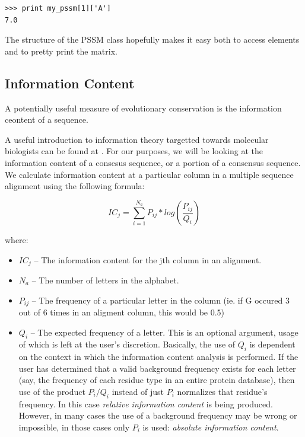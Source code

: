 \documentclass{report}
\begin{document}
\begin{verbatim}
>>> print my_pssm[1]['A']
7.0
\end{verbatim}

The structure of the PSSM class hopefully makes it easy both to access elements and to pretty print the matrix.

\subsection{Information Content}
\label{sec:getting_info_content}

A potentially useful measure of evolutionary conservation is the information ceontent of a sequence.


A useful introduction to information theory targetted towards molecular biologists can be found at . For our purposes, we will be looking at the information content of a consesus sequence, or a portion of a consensus sequence. We calculate information content at a particular column in a multiple sequence alignment using the following formula:

\begin{displaymath}
IC_{j} = \sum_{i=1}^{N_{a}} P_{ij} * log(\frac{P_{ij}}{Q_{i}}) 
\end{displaymath}

where:

\begin{itemize}
  \item $IC_{j}$ -- The information content for the jth column in an alignment.
  \item $N_{a}$ -- The number of letters in the alphabet.
  \item $P_{ij}$ -- The frequency of a particular letter in the column (ie. if G occured 3 out of 6 times in an aligment column, this would be 0.5)
  \item $Q_{i}$ --  The expected frequency of a letter. This is an optional argument, usage of which is left at the user's discretion. Basically, the use of $Q_{i}$ is dependent on the context in which the information content analysis is performed. If the user has determined that a valid background frequency exists for each letter (say, the frequency of each residue type in an entire protein database), then use of the product $P_{i} / Q_{i}$ instead of just $P_i$ normalizes that residue's frequency. In this case \emph{relative information content} is being produced. However, in many cases the use of a background frequency may be wrong or impossible, in those cases only $P_{i}$ is used: \emph{absolute information content}.
\end{itemize}
\end{document}
